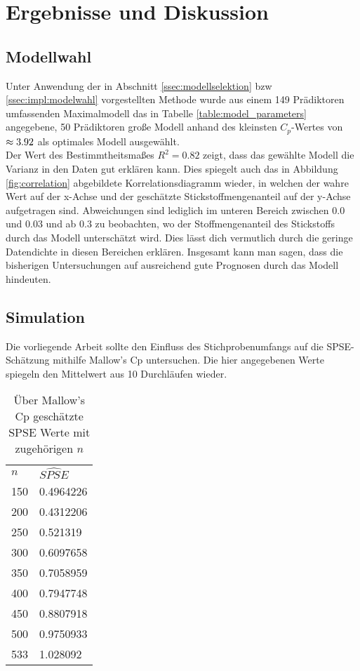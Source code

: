 \section{Ergebnisse und Diskussion}
\label{sec:discuss}

\subsection{Modellwahl}
\label{ssec:discuss:modelselect}
Unter Anwendung der in Abschnitt \ref{ssec:modellselektion} bzw \ref{ssec:impl:modelwahl} vorgestellten Methode wurde aus einem 149 Prädiktoren umfassenden Maximalmodell das in Tabelle \ref{table:model_parameters} angegebene, 50 Prädiktoren große Modell anhand des kleinsten $C_p$-Wertes von $\mathrm{\approx3.92}$ als optimales Modell ausgewählt.\\

Der Wert des Bestimmtheitsmaßes $R^2 = 0.82$ zeigt, dass das gewählte Modell die Varianz in den Daten gut erklären kann. Dies spiegelt auch das in Abbildung \ref{fig:correlation} abgebildete Korrelationsdiagramm wieder, in welchen der wahre Wert auf der x-Achse und der geschätzte Stickstoffmengenanteil auf der y-Achse aufgetragen sind.
Abweichungen sind lediglich im unteren Bereich zwischen $0.0$ und $0.03$ und ab $0.3$ zu beobachten, wo der Stoffmengenanteil des Stickstoffs durch das Modell unterschätzt wird.
Dies lässt dich vermutlich durch die geringe Datendichte in diesen Bereichen erklären.
Insgesamt kann man sagen, dass die bisherigen Untersuchungen auf ausreichend gute Prognosen durch das Modell hindeuten.



\subsection{Simulation}
\label{ssec:discuss:simulation}
Die vorliegende Arbeit sollte den Einfluss des Stichprobenumfangs auf die SPSE-Schätzung mithilfe Mallow's Cp untersuchen. Die hier angegebenen Werte spiegeln den Mittelwert aus 10 Durchläufen wieder.

\begin{table}[]
	\caption{Über Mallow's Cp geschätzte SPSE Werte mit zugehörigen $n$}
	\begin{tabular}{|l|l|}
		\cline{1-2}
		$n$   & $\hat{SPSE}$ \\ 		\cline{1-2}
		150 &  0.4964226   \\ \cline{1-2}
		200 &  0.4312206   \\ \cline{1-2}
		250 &  0.521319    \\ \cline{1-2}
		300 &  0.6097658  \\ \cline{1-2}
		350 &  0.7058959   \\ \cline{1-2}
		400 &  0.7947748 \\ \cline{1-2}
		450 &  0.8807918  \\ \cline{1-2}
		500 &  0.9750933   \\ \cline{1-2}
		533 &  1.028092   \\ \cline{1-2}

						\end{tabular}
\end{table}

